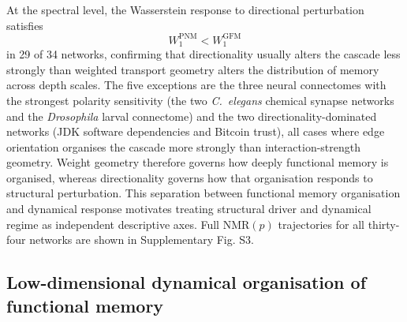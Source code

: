 \documentclass[aps,superscriptaddress,11pt]{revtex4-2}
\newcommand{\NMR}{\mathrm{NMR}}
\theoremstyle{definition}
\theoremstyle{plain}
\begin{document}
At the spectral level, the Wasserstein response to directional perturbation
satisfies
\[
W_1^{\mathrm{PNM}} < W_1^{\mathrm{GFM}}
\]
in 29 of 34 networks, confirming that directionality usually alters the
cascade less strongly than weighted transport geometry alters the
distribution of memory across depth scales. The five exceptions are the
three neural connectomes with the strongest polarity sensitivity (the two
\textit{C.~elegans} chemical synapse networks and the \textit{Drosophila}
larval connectome) and the two directionality-dominated networks (JDK
software dependencies and Bitcoin trust), all cases where edge orientation
organises the cascade more strongly than interaction-strength geometry.
Weight geometry therefore governs how deeply functional memory is organised,
whereas directionality governs how that organisation responds to structural
perturbation. This separation between functional memory organisation and
dynamical response motivates treating structural driver and dynamical regime
as independent descriptive axes. Full $\NMR(p)$ trajectories for all
thirty-four networks are shown in Supplementary Fig. S3.

\subsection{Low-dimensional dynamical organisation of functional memory}
\end{document}
